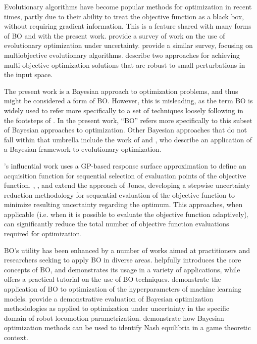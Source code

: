 \documentclass[10pt,a4paper]{article}
\begin{document}
Evolutionary algorithms have become popular methods for optimization in recent times, partly due to their ability to treat the objective function as a black box, without requiring gradient information.
This is a feature shared with many forms of BO and with the present work.
\citet{Jin2003} provide a survey of work on the use of evolutionary optimization under uncertainty.
\citet{Zhou2011b} provide a similar survey, focusing on multiobjective evolutionary algorithms.
\citet{Deb2006} describe two approaches for achieving multi-objective optimization solutions that are robust to small perturbations in the input space.

The present work is a Bayesian approach to optimization problems, and thus might be considered a form of BO.
However, this is misleading, as the term BO is widely used to refer more specifically to a set of techniques loosely following in the footsteps of \citet{Jones1998}.
In the present work, ``BO'' refers more specifically to this subset of Bayesian approaches to optimization.
Other Bayesian approaches that do not fall within that umbrella include the work of \citet{Pelikan1999} and \citet{Pelikan2005}, who describe an application of a Bayesian framework to evolutionary optimization.

\citeauthor{Jones1998}'s \citeyearpar{Jones1998} influential work uses a GP-based response surface approximation to define an acquisition function for sequential selection of evaluation points of the objective function.
\citet{Vazquez2009}, \citet{Bect2012}, and \citet{Chevalier2014} extend the approach of Jones, developing a stepwise uncertainty reduction methodology for sequential evaluation of the objective function to minimize resulting uncertainty regarding the optimum.
This approaches, when applicable (i.e. when it is possible to evaluate the objective function adaptively), can significantly reduce the total number of objective function evaluations required for optimization.

BO's utility has been enhanced by a number of works aimed at practitioners and researchers seeking to apply BO in diverse areas.
\citet{Shahriari2016} helpfully introduces the core concepts of BO, and demonstrates its usage in a variety of applications, while \citet{Frazier2018} offers a practical tutorial on the use of BO techniques.
\citet{Snoek2012} demonstrate the application of BO to optimization of the hyperparameters of machine learning models.
\citet{Calandra2016} provide a demonstrative evaluation of Bayesian optimization methodologies as applied to optimization under uncertainty in the specific domain of robot locomotion parametrization.
\citet{Picheny2019} demonstrate how Bayesian optimization methods can be used to identify Nash equilibria in a game theoretic context.
\end{document}
